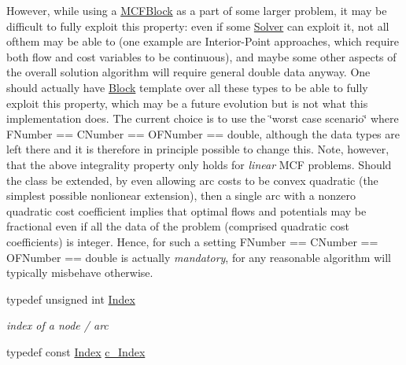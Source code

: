 \begin{Indent}
{However, while using a \mbox{\hyperlink{class_s_m_spp__di__unipi__it_1_1_m_c_f_block}{M\+C\+F\+Block}} as a part of some larger problem, it may be difficult to fully exploit this property\+: even if some \mbox{\hyperlink{class_s_m_spp__di__unipi__it_1_1_solver}{Solver}} can exploit it, not all ofthem may be able to (one example are Interior-\/\+Point approaches, which require both flow and cost variables to be continuous), and maybe some other aspects of the overall solution algorithm will require general double data anyway. One should actually have \mbox{\hyperlink{class_s_m_spp__di__unipi__it_1_1_block}{Block}} template over all these types to be able to fully exploit this property, which may be a future evolution but is not what this implementation does. The current choice is to use the \char`\"{}worst case scenario\char`\"{} where F\+Number == C\+Number == O\+F\+Number == double, although the data types are left there and it is therefore in principle possible to change this. Note, however, that the above integrality property only holds for {\itshape linear} M\+CF problems. Should the class be extended, by even allowing arc costs to be convex quadratic (the simplest possible nonlionear extension), then a single arc with a nonzero quadratic cost coefficient implies that optimal flows and potentials may be fractional even if all the data of the problem (comprised quadratic cost coefficients) is integer. Hence, for such a setting F\+Number == C\+Number == O\+F\+Number == double is actually {\itshape mandatory}, for any reasonable algorithm will typically misbehave otherwise. }\begin{DoxyCompactItemize}
\item 
\mbox{\label{class_s_m_spp__di__unipi__it_1_1_m_c_f_block_ad53d6229d7ec28555a9c9c2fd9abf773}} 
typedef unsigned int \mbox{\hyperlink{class_s_m_spp__di__unipi__it_1_1_m_c_f_block_ad53d6229d7ec28555a9c9c2fd9abf773}{Index}}
\begin{DoxyCompactList}\small\item\em index of a node / arc \end{DoxyCompactList}\item 
\mbox{\label{class_s_m_spp__di__unipi__it_1_1_m_c_f_block_aee6156e2ce80720d57a082d80f39d8cc}} 
typedef const \mbox{\hyperlink{class_s_m_spp__di__unipi__it_1_1_m_c_f_block_ad53d6229d7ec28555a9c9c2fd9abf773}{Index}} \mbox{\hyperlink{class_s_m_spp__di__unipi__it_1_1_m_c_f_block_aee6156e2ce80720d57a082d80f39d8cc}{c\+\_\+\+Index}}

\end{DoxyCompactItemize}
\end{Indent}
